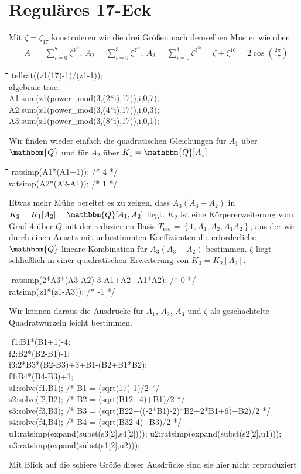 \documentclass[11pt]{article}
\newcommand{\br}[1]{\ensuremath{\left(#1\right)}}
\newcommand{\cbr}[1]{\ensuremath{\left\{#1\right\}}}
\newcommand{\Q}{\mathbbm{Q}}
\def\pw{{\char94}}
\newenvironment{code}{\tt \begin{tabbing}
\hskip12pt\=\hskip12pt\=\hskip12pt\=\hskip12pt\=\hskip5cm\=\hskip5cm\=\kill}
{\end{tabbing}}
\begin{document}
\section{Reguläres 17-Eck}

Mit $\zeta=\zeta_{17}$ konstruieren wir die drei Größen nach demselben Muster
wie oben
\begin{align*}
  A_1=\sum_{i=0}^7{\zeta^{3^{2i}}},\
  A_2=\sum_{i=0}^3{\zeta^{3^{4i}}},\
  A_3=\sum_{i=0}^1{\zeta^{3^{8i}}}=\zeta+\zeta^{16}=2\cos\br{\frac{2\pi}{17}}
\end{align*}

\begin{code}  
tellrat((z1\pw(17)-1)/(z1-1));\\
algebraic:true;\\
A1:sum(z1\pw(power\_mod(3,(2*i),17)),i,0,7);\\
A2:sum(z1\pw(power\_mod(3,(4*i),17)),i,0,3);\\
A3:sum(z1\pw(power\_mod(3,(8*i),17)),i,0,1);
\end{code}
Wir finden wieder einfach die quadratischen Gleichungen für $A_1$ über $\Q$
und für $A_2$ über $K_1=\Q[A_1]$ 
\begin{code}  
ratsimp(A1*(A1+1));  /* 4 */\\
ratsimp(A2*(A2-A1)); /* 1 */
\end{code}
Etwas mehr Mühe bereitet es zu zeigen, dass $A_3(A_3-A_2)$ in
$K_2=K_1[A_2]=\Q[A_1,A_2]$ liegt. $K_2$ ist eine Körpererweiterung vom Grad 4
über $Q$ mit der reduzierten Basis $T_\text{red}=\cbr{1,A_1,A_2,A_1A_2}$, aus
der wir durch einen Ansatz mit unbestimmten Koeffizienten die erforderliche
$\Q$-lineare Kombination für $A_3(A_3-A_2)$ bestimmen.  $\zeta$ liegt
schließlich in einer quadratischen Erweiterung von $K_3=K_2[A_3]$.
\begin{code}  
ratsimp(2*A3*(A3-A2)-3-A1+A2+A1*A2); /* 0 */\\
ratsimp(z1*(z1-A3)); /* -1 */
\end{code}
Wir können daraus die Ausdrücke für $A_1$, $A_2$, $A_3$ und $\zeta$ als
geschachtelte Quadratwurzeln leicht bestimmen.
\begin{code}  
f1:B1*(B1+1)-4;   \\
f2:B2*(B2-B1)-1;  \\
f3:2*B3*(B2-B3)+3+B1-(B2+B1*B2);\\  
f4:B4*(B4-B3)+1;  \\
s1:solve(f1,B1);  /* B1 = (sqrt(17)-1)/2 */\\
s2:solve(f2,B2);  /* B2 = (sqrt(B1\pw2+4)+B1)/2 */\\
s3:solve(f3,B3);  /* B3 = (sqrt(B2\pw2+((-2*B1)-2)*B2+2*B1+6)+B2)/2 */\\
s4:solve(f4,B4);  /* B4 = (sqrt(B3\pw2-4)+B3)/2 */\\[1em]
u1:ratsimp(expand(subst(s3[2],s4[2])));
u2:ratsimp(expand(subst(s2[2],u1)));
u3:ratsimp(expand(subst(s1[2],u2)));
\end{code}
Mit Blick auf die schiere Größe dieser Ausdrücke sind sie hier nicht reproduziert
\end{document}
